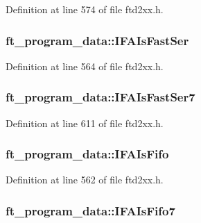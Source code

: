Definition at line 574 of file ftd2xx.h.\hypertarget{structft__program__data_ac183f4ed8ee74ecc9a006962c1ef793c}{
\subsubsection[{IFAIsFastSer}]{ {\bf ft\_\-program\_\-data::IFAIsFastSer}}}
\label{structft__program__data_ac183f4ed8ee74ecc9a006962c1ef793c}


Definition at line 564 of file ftd2xx.h.\hypertarget{structft__program__data_ac3f9c09e31314252360e6c9a44606487}{
\subsubsection[{IFAIsFastSer7}]{ {\bf ft\_\-program\_\-data::IFAIsFastSer7}}}
\label{structft__program__data_ac3f9c09e31314252360e6c9a44606487}


Definition at line 611 of file ftd2xx.h.\hypertarget{structft__program__data_ac2bc8bf7e54408c73c4010d922cf809d}{
\subsubsection[{IFAIsFifo}]{ {\bf ft\_\-program\_\-data::IFAIsFifo}}}
\label{structft__program__data_ac2bc8bf7e54408c73c4010d922cf809d}


Definition at line 562 of file ftd2xx.h.\hypertarget{structft__program__data_aada296f4be68214c88608cf1657e14bf}{
\subsubsection[{IFAIsFifo7}]{ {\bf ft\_\-program\_\-data::IFAIsFifo7}}}
\label{structft__program__data_aada296f4be68214c88608cf1657e14bf}



